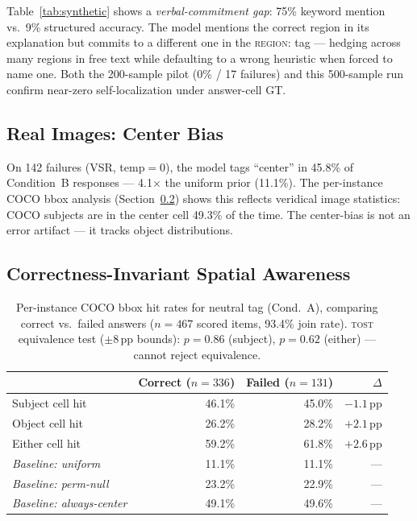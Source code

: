 \documentclass[twoside,11pt]{article}
\begin{document}
Table~\ref{tab:synthetic} shows a \emph{verbal-commitment gap}: 75\% keyword
mention vs.\ 9\% structured accuracy.
The model mentions the correct region in its explanation but commits to a different
one in the \textsc{region:} tag — hedging across many regions in free text while
defaulting to a wrong heuristic when forced to name one.
Both the 200-sample pilot (0\% / 17 failures) and this 500-sample run confirm
near-zero self-localization under answer-cell GT.

\subsection{Real Images: Center Bias}
\label{sec:center}

On 142 failures (VSR, temp$=0$), the model tags ``center'' in 45.8\% of
Condition~B responses — 4.1$\times$ the uniform prior (11.1\%).
The per-instance COCO bbox analysis (Section~\ref{sec:coco}) shows this reflects
veridical image statistics: COCO subjects are in the center cell 49.3\% of the time.
The center-bias is not an error artifact — it tracks object distributions.

\subsection{Correctness-Invariant Spatial Awareness}
\label{sec:coco}

\begin{table}[t]
\centering
\small
\begin{tabular}{lrrr}
\toprule
 & Correct ($n{=}336$) & Failed ($n{=}131$) & $\Delta$ \\
\midrule
Subject cell hit & 46.1\% & 45.0\% & $-1.1$\,pp \\
Object cell hit & 26.2\% & 28.2\% & $+2.1$\,pp \\
Either cell hit & 59.2\% & 61.8\% & $+2.6$\,pp \\
\midrule
\emph{Baseline: uniform} & 11.1\% & 11.1\% & — \\
\emph{Baseline: perm-null} & 23.2\% & 22.9\% & — \\
\emph{Baseline: always-center} & 49.1\% & 49.6\% & — \\
\bottomrule
\end{tabular}
\caption{Per-instance COCO bbox hit rates for neutral tag (Cond.\ A),
comparing correct vs.\ failed answers ($n{=}467$ scored items, 93.4\% join rate).
\textsc{tost} equivalence test ($\pm 8$\,pp bounds): $p{=}0.86$ (subject),
$p{=}0.62$ (either) — cannot reject equivalence.}
\label{tab:coco}
\end{table}
\end{document}
